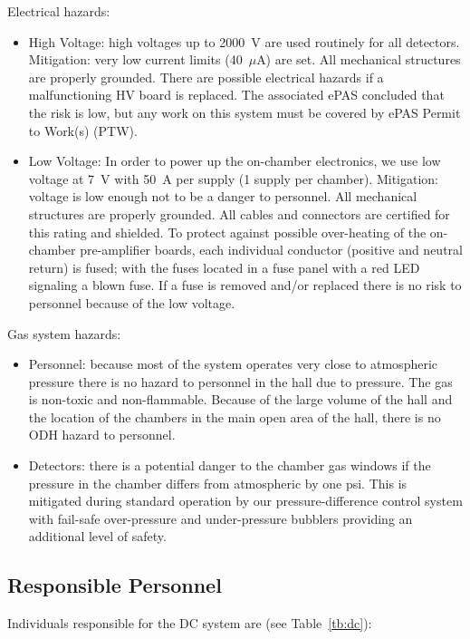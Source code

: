 Electrical hazards:
\begin{itemize}
\item High Voltage: high voltages up to 2000~V are used routinely for all detectors. Mitigation: 
very low current limits (40~$\mu$A) are set. All mechanical structures are properly grounded.  
There are possible electrical hazards if a malfunctioning HV board is replaced. The associated
ePAS concluded that the risk is low, but any work on this system must be covered by ePAS Permit
to Work(s) (PTW).

\item Low Voltage: In order to power up the on-chamber electronics, we use low voltage at 7~V 
with 50~A per supply (1 supply per chamber). Mitigation: voltage is low enough not to be a 
danger to personnel. All mechanical structures are properly grounded. All cables and connectors 
are certified for this rating and shielded. To protect against possible over-heating of the 
on-chamber pre-amplifier boards, each individual conductor (positive and neutral return) is 
fused; with the fuses located in a fuse panel with a red LED signaling a blown fuse. If a 
fuse is removed and/or replaced there is no risk to personnel because of the low voltage.

\end{itemize}

Gas system hazards:
\begin{itemize}
\item Personnel: because most of the system operates very close to atmospheric pressure there 
is no hazard to personnel in the hall due to pressure. The gas is non-toxic and non-flammable.  
Because of the large volume of the hall and the location of the chambers in the main open area 
of the hall, there is no ODH hazard to personnel.
\item Detectors: there is a potential danger to the chamber gas windows if the pressure in the 
chamber differs from atmospheric by one psi. This is mitigated during standard operation by our 
pressure-difference control system with fail-safe over-pressure and under-pressure bubblers 
providing an additional level of safety.
\end{itemize}

\subsection{Responsible Personnel}

Individuals responsible for the DC system are (see Table~\ref{tb:dc}):

